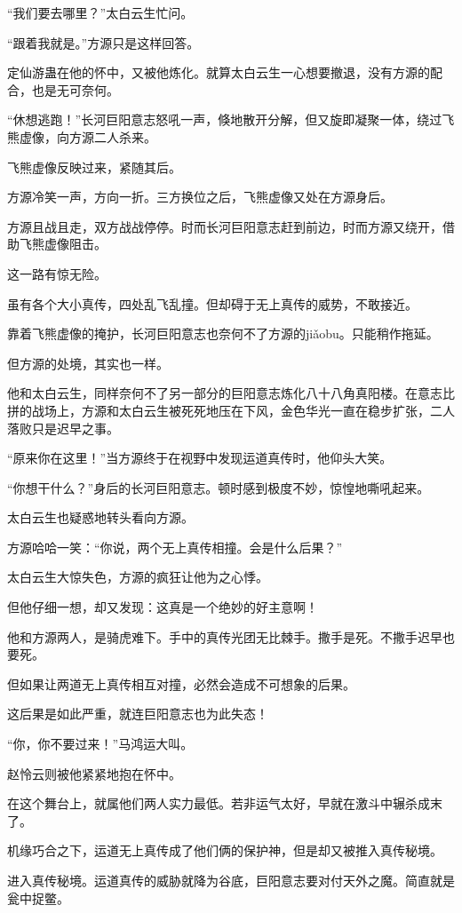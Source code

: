 \begin{this_body}
“我们要去哪里？”太白云生忙问。

“跟着我就是。”方源只是这样回答。

定仙游蛊在他的怀中，又被他炼化。就算太白云生一心想要撤退，没有方源的配合，也是无可奈何。

“休想逃跑！”长河巨阳意志怒吼一声，倏地散开分解，但又旋即凝聚一体，绕过飞熊虚像，向方源二人杀来。

飞熊虚像反映过来，紧随其后。

方源冷笑一声，方向一折。三方换位之后，飞熊虚像又处在方源身后。

方源且战且走，双方战战停停。时而长河巨阳意志赶到前边，时而方源又绕开，借助飞熊虚像阻击。

这一路有惊无险。

虽有各个大小真传，四处乱飞乱撞。但却碍于无上真传的威势，不敢接近。

靠着飞熊虚像的掩护，长河巨阳意志也奈何不了方源的jiǎobu。只能稍作拖延。

但方源的处境，其实也一样。

他和太白云生，同样奈何不了另一部分的巨阳意志炼化八十八角真阳楼。在意志比拼的战场上，方源和太白云生被死死地压在下风，金色华光一直在稳步扩张，二人落败只是迟早之事。

“原来你在这里！”当方源终于在视野中发现运道真传时，他仰头大笑。

“你想干什么？”身后的长河巨阳意志。顿时感到极度不妙，惊惶地嘶吼起来。

太白云生也疑惑地转头看向方源。

方源哈哈一笑：“你说，两个无上真传相撞。会是什么后果？”

太白云生大惊失色，方源的疯狂让他为之心悸。

但他仔细一想，却又发现：这真是一个绝妙的好主意啊！

他和方源两人，是骑虎难下。手中的真传光团无比棘手。撒手是死。不撒手迟早也要死。

但如果让两道无上真传相互对撞，必然会造成不可想象的后果。

这后果是如此严重，就连巨阳意志也为此失态！

“你，你不要过来！”马鸿运大叫。

赵怜云则被他紧紧地抱在怀中。

在这个舞台上，就属他们两人实力最低。若非运气太好，早就在激斗中辗杀成末了。

机缘巧合之下，运道无上真传成了他们俩的保护神，但是却又被推入真传秘境。

进入真传秘境。运道真传的威胁就降为谷底，巨阳意志要对付天外之魔。简直就是瓮中捉鳖。


\end{this_body}
